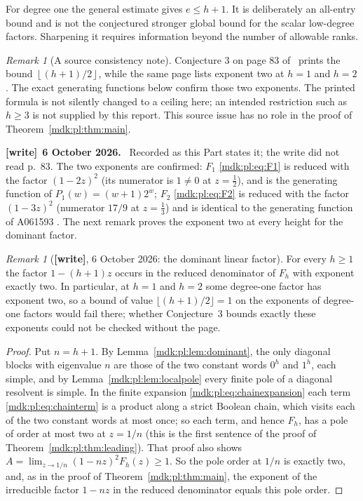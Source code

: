 \documentclass[11pt,letterpaper]{article}
\numberwithin{equation}{section}
\theoremstyle{remark}\newtheorem{remark}[theorem]{Remark}
\newcommand{\floor}[1]{\left\lfloor #1\right\rfloor}
\newenvironment{writenote}[1][]{\par\smallskip\begingroup\small
 \noindent\textbf{[write]}\if\relax\detokenize{#1}\relax\else~\textbf{#1.}\fi\ }%
 {\par\endgroup\smallskip}
\newcommand{\wtag}{\textup{\textbf{[write]}}}
\begin{document}
For degree one the general estimate gives $e\le h+1$. It is deliberately an all-entry bound and is not the conjectured stronger global bound for the scalar low-degree factors. Sharpening it requires information beyond the number of allowable ranks.

\begin{remark}[A source consistency note]\label{mdk:pl:rem:source}
Conjecture 3 on page 83 of~\cite{kotesovec} prints the bound $\floor{(h+1)/2}$, while the same page lists exponent two at $h=1$ and $h=2$. The exact generating functions below confirm those two exponents. The printed formula is not silently changed to a ceiling here; an intended restriction such as $h\ge3$ is not supplied by this report. This source issue has no role in the proof of Theorem~\ref{mdk:pl:thm:main}.
\end{remark}
\begin{writenote}[6 October 2026]
Recorded as this Part states it; the write did not read p.~83. The two exponents are confirmed: $F_1$ \eqref{mdk:pl:eq:F1} is reduced with the factor $(1-2z)^2$ (its numerator is $1\ne0$ at $z=\frac12$), and is the generating function of $P_1(w)=(w+1)2^w$; $F_2$ \eqref{mdk:pl:eq:F2} is reduced with the factor $(1-3z)^2$ (numerator $17/9$ at $z=\frac13$) and is identical to the generating function of A061593 \cite{oeisA061593}. The next remark proves the exponent two at every height for the dominant factor.
\end{writenote}
\begin{remark}[\wtag, 6 October 2026: the dominant linear factor]\label{mdk:pl:rem:linear-exponent}
For every $h\ge1$ the factor $1-(h+1)z$ occurs in the reduced denominator of $F_h$ with exponent exactly two. In particular, at $h=1$ and $h=2$ some degree-one factor has exponent two, so a bound of value $\lfloor(h+1)/2\rfloor=1$ on the exponents of degree-one factors would fail there; whether Conjecture~3 bounds exactly these exponents could not be checked without the page.
\end{remark}
\begin{proof}
Put $n=h+1$. By Lemma~\ref{mdk:pl:lem:dominant}, the only diagonal blocks with eigenvalue $n$ are those of the two constant words $0^h$ and $1^h$, each simple, and by Lemma~\ref{mdk:pl:lem:localpole} every finite pole of a diagonal resolvent is simple. In the finite expansion \eqref{mdk:pl:eq:chainexpansion} each term \eqref{mdk:pl:eq:chainterm} is a product along a strict Boolean chain, which visits each of the two constant words at most once; so each term, and hence $F_h$, has a pole of order at most two at $z=1/n$ (this is the first sentence of the proof of Theorem~\ref{mdk:pl:thm:leading}). That proof also shows $A=\lim_{z\to1/n}(1-nz)^2F_h(z)\ge1$. So the pole order at $1/n$ is exactly two, and, as in the proof of Theorem~\ref{mdk:pl:thm:main}, the exponent of the irreducible factor $1-nz$ in the reduced denominator equals this pole order.
\end{proof}
\end{document}

